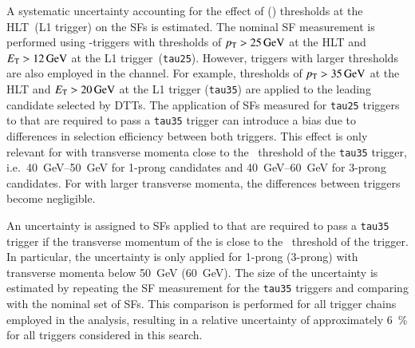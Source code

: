 A systematic uncertainty accounting for the effect of \tauhadvis \pT (\ET)
thresholds at the HLT~(L1 trigger) on the \faketauhadvis SFs is estimated. The
nominal SF measurement is performed using \tauhadvis-triggers with thresholds of
$p_{\text{T}} > \SI{25}{\ensuremath{\text{GeV}}}$ at the HLT and $\ET > \SI{12}{\GeV}$ at the L1
trigger~(\texttt{tau25}). However, triggers with larger thresholds are also
employed in the \hadhad channel. For example, thresholds of
$p_{\text{T}} > \SI{35}{\ensuremath{\text{GeV}}}$ at the HLT and $\ET > \SI{20}{\GeV}$ at the L1 trigger
(\texttt{tau35}) are applied to the leading \tauhadvis candidate selected by
DTTs. The application of SFs measured for \texttt{tau25} triggers to
\faketauhadvis that are required to pass a \texttt{tau35} trigger can introduce
a bias due to differences in selection efficiency between both triggers. This
effect is only relevant for \faketauhadvis with transverse momenta close to the
\pT~threshold of the \texttt{tau35} trigger, i.e.\
\SIrange[range-phrase=--]{40}{50}{\GeV} for 1-prong candidates and
\SIrange[range-phrase=--]{40}{60}{\GeV} for 3-prong candidates. For
\faketauhadvis with larger transverse momenta, the differences between triggers
become negligible.


An uncertainty is assigned to SFs applied to \faketauhadvis that are required to
pass a \texttt{tau35} trigger if the transverse momentum of the \faketauhadvis
is close to the \pT~threshold of the trigger. In particular, the uncertainty is
only applied for 1-prong (3-prong) \faketauhadvis with transverse momenta below
\SI{50}{\GeV} (\SI{60}{\GeV}). The size of the uncertainty is estimated by
repeating the SF measurement for the \texttt{tau35} triggers and comparing with
the nominal set of SFs. This comparison is performed for all trigger chains
employed in the analysis, resulting in a relative uncertainty of approximately
\SI{6}{\percent} for all triggers considered in this search.

